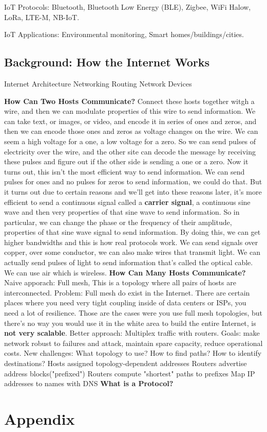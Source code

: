 \documentclass[11 pt]{scrartcl}
\begin{document}
    \ii IoT Protocols: Bluetooth, Bluetooth Low Energy (BLE), Zigbee, WiFi Halow, LoRa, LTE-M, NB-IoT. 

    \ii IoT Applications: Environmental monitoring, Smart homes/buildings/cities.
\itemend
\subsection{Background: How the Internet Works}
\begin{enumerate}
    \ii Internet Architecture
    \ii Networking Routing
    \ii Network Devices
\end{enumerate}
\textbf{How Can Two Hosts Communicate?}\newline
Connect these hosts together witgh a wire, and then we can modulate properties of this wire to send information. We can take text, or images, or video, and encode it in series of ones and zeros, and then we can encode those ones and zeros as voltage changes on the wire. We can seem a high voltage for a one, a low voltage for a zero. So we can send pulses of electricity over the wire, and the other site can decode the message by receiving these pulses and figure out if the other side is sending a one or a zero.  Now it turns out, this isn't the most efficient way to send information. We can send pulses for ones and no pulses for zeros to send information, we could do that. But it turns out due to certain reasons and we'll get into these reasons later, it's more efficient to send a continuous signal called a \textbf{carrier signal}, a continuous sine wave and then very properties of that sine wave to send information. So in particular, we can change the phase or the frequency of their amplitude, properties of that sine wave signal to send information. By doing this, we can get higher bandwidths and this is how real protocols work. We can send signals over copper, over some conductor, we can also make wires that transmit light. We can actually send pulses of light to send information that's called the optical cable. We can use air which is wireless.\newline
\textbf{How Can Many Hosts Communicate?}\newline
Naive apporach: Full mesh, This is a topology where all pairs of hosts are interconnected. Problem: Full mesh do exist in the Internet. There are certain places where you need very tight coupling inside of data centers or ISPs, you need a lot of resilience. Those are the cases were you use full mesh topologies, but there's no way you would use it in the white area to build the entire Internet, is \textbf{not very scalable}. Better approach: Multiplex traffic with routers. Goals: make network robust to failures and attack, maintain spare capacity, reduce operational costs. New challenges: What topology to use? How to find paths? How to identify destinations? 
\itemnum
    \ii Hosts assigned topology-dependent addresses
    \ii Routers advertise address blocks("prefixed")
    \ii Routers compute "shortest" paths to prefixes
    \ii Map IP addresses to names with DNS
\itemend
\textbf{What is a Protocol?}
\section{Appendix}
\renewcommand{\listtheoremname}{List of Definitions and Theorems}
\listoftheorems[ignoreall,show={theorem,definition}]

\listoftodos
\end{document}
